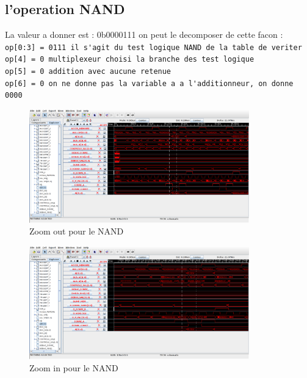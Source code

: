 \documentclass{article}
\begin{document}
\subsection*{l'operation NAND}
La valeur a donner est : 0b0000111
on peut le decomposer de cette facon : \\
\verb|op[0:3] = 0111 il s'agit du test logique NAND de la table de veriter | \\
\verb|op[4] = 0 multiplexeur choisi la branche des test logique | \\
\verb|op[5] = 0 addition avec aucune retenue| \\
\verb|op[6] = 0 on ne donne pas la variable a a l'additionneur, on donne 0000| \\
\begin{figure}[!h]
	\centering
	\includegraphics[width=0.85\textwidth]{e1-q4-p1.png}
	\caption{Zoom out pour le NAND}
	\label{}
\end{figure}
\begin{figure}[!h]
	\centering
	\includegraphics[width=0.85\textwidth]{e1-q4-p2.png}
	\caption{Zoom in pour le NAND}
	\label{}
\end{figure}
\newpage
\end{document}

